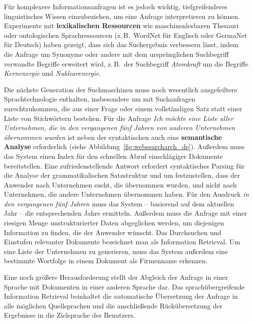 \documentclass[]{../../metanetpaper}
\begin{document}
\begin{multicols}{2}
Für komplexere Informationsanfragen ist es jedoch wichtig, tiefgreifenderes linguistisches Wissen einzubeziehen, um eine Anfrage interpretieren zu können. Experimente mit \textbf{lexikalischen Ressourcen} wie maschinenlesbaren Thesauri oder ontologischen Sprachressourcen (z.\,B.~WordNet für Englisch oder GermaNet für Deutsch) haben gezeigt, dass sich das Suchergebnis verbessern lässt, indem die Anfrage um Synonyme oder andere mit dem ursprünglichen Suchbegriff verwandte Begriffe erweitert wird, z.\,B.~der Suchbegriff \textit{Atomkraft} um die Begriffe \textit{Kernenergie} und \textit{Nuklearenergie}. 

Die nächste Generation der Suchmaschinen muss noch wesentlich ausgefeiltere Sprachtechnologie enthalten, insbesondere um mit Suchanfragen zurechtzukommen, die aus einer Frage oder einem vollständigen Satz statt einer Liste von Stichwörtern bestehen. Für die Anfrage \textit{Ich möchte eine Liste aller Unternehmen, die in den vergangenen fünf Jahren von anderen Unternehmen übernommen wurden} ist neben der syntaktischen auch eine \textbf{semantische Analyse} erforderlich (siehe Abbildung~\ref{fig:websearcharch_de}). Außerdem muss das System einen Index für den schnellen Abruf einschlägiger Dokumente bereitstellen. Eine zufriedenstellende Antwort erfordert syntaktisches Parsing für die Analyse der grammatikalischen Satzstruktur und um festzustellen, dass der Anwender nach Unternehmen sucht, die übernommen wurden, und nicht nach Unternehmen, die andere Unternehmen übernommen haben. Für den Ausdruck \textit{in den vergangenen fünf Jahren} muss das System -- basierend auf dem aktuellen Jahr -- die entsprechenden Jahre ermitteln. Außerdem muss die Anfrage mit einer riesigen Menge unstrukturierter Daten abgeglichen werden, um diejenigen Information zu finden, die der Anwender wünscht. Das Durchsuchen und Einstufen relevanter Dokumente bezeichnet man als Information Retrieval. Um eine Liste der Unternehmen zu generieren, muss das System außerdem eine bestimmte Wortfolge in einem Dokument als Firmenname erkennen.


Eine noch größere Herausforderung stellt der Abgleich der Anfrage in einer Sprache mit Dokumenten in einer anderen Sprache dar. Das sprachübergreifende Information Retrieval beinhaltet die automatische Übersetzung der Anfrage in alle möglichen Quellsprachen und die anschließende Rückübersetzung der Ergebnisse in die Zielsprache des Benutzers. 


\end{multicols}
\end{document}
